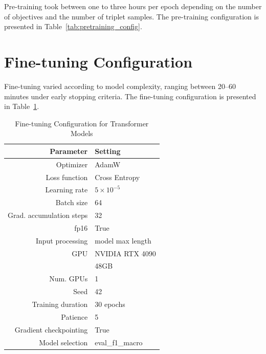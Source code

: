 Pre-training took between one to three hours per epoch depending on the number of objectives and the number of triplet samples. The pre-training configuration is presented in Table~\ref{tab:pretraining_config}.

\section{Fine-tuning Configuration}

Fine-tuning varied according to model complexity, ranging between 20--60 minutes under early stopping criteria. The fine-tuning configuration is presented in Table~\ref{tab:finetuning_config}.

\begin{table}[ht]
    \centering
    \small
    \begin{tabular}{@{}rl@{}}
        \toprule
        \textbf{Parameter} & \textbf{Setting} \\
        \midrule
        Optimizer & AdamW \\
        Loss function & Cross Entropy \\
        Learning rate & $5 \times 10^{-5}$ \\
        Batch size & 64 \\
        Grad. accumulation steps & 32 \\
        fp16 & True \\
        Input processing & model max length\\
        GPU & NVIDIA RTX 4090 \\
        & 48GB \\
        Num. GPUs & 1 \\
        Seed & 42 \\
        Training duration & 30 epochs \\
        Patience & 5 \\
        Gradient checkpointing & True \\
        Model selection & eval\_f1\_macro\\
        \bottomrule
    \end{tabular}
    \caption{Fine-tuning Configuration for Transformer Models}
    \label{tab:finetuning_config}
\end{table}

